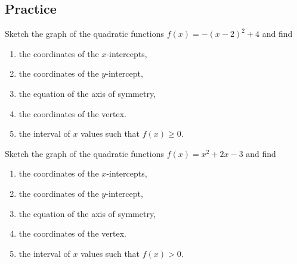 \subsection{Practice}

\begin{exercise}

Sketch the graph of the quadratic functions \(f(x)=-(x-2)^2+4\) and find

\begin{enumerate}
\item
  the coordinates of the \(x\)-intercepts,
\item
  the coordinates of the \(y\)-intercept,
\item
  the equation of the axis of symmetry,
\item
  the coordinates of the vertex.
\item
  the interval of \(x\) values such that \(f(x)\geq 0\).
\end{enumerate}

\end{exercise}

\begin{exercise}

Sketch the graph of the quadratic functions \(f(x)=x^2+2x-3\) and find

\begin{enumerate}
\item
  the coordinates of the \(x\)-intercepts,
\item
  the coordinates of the \(y\)-intercept,
\item
  the equation of the axis of symmetry,
\item
  the coordinates of the vertex.
\item
  the interval of \(x\) values such that \(f(x)>0\).
\end{enumerate}

\end{exercise}


